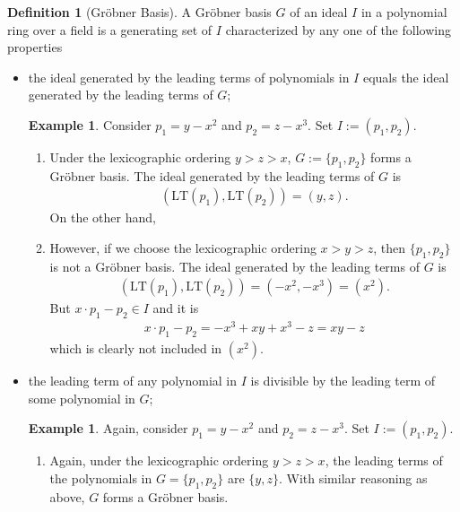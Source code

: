 \documentclass{book}
\theoremstyle{plain}
\theoremstyle{definition}
\newtheorem{exmp}[thm]{Example} %
\theoremstyle{custom_definition}
\newtheorem{defn}[thm]{Definition}
\begin{document}
\begin{defn}[Gröbner Basis]
A Gröbner basis \(G\) of an ideal \(I\) in a polynomial ring over a field is a generating set of \(I\) characterized by any one of the following properties
\begin{itemize}
    \item the ideal generated by the leading terms of polynomials in \(I\) equals the ideal generated by the leading terms of \(G\);
    \begin{exmp}
        Consider \(p_1 = y - x^2\) and \(p_2 = z - x^3\). Set \(I := (p_1, p_2)\).
        \begin{enumerate}
            \item Under the lexicographic ordering \(y > z > x\), \(G := \{p_1, p_2\}\) forms a Gröbner basis. The ideal generated by the leading terms of \(G\) is
            \begin{align}
                (\mathrm{LT}(p_1), \mathrm{LT}(p_2)) = (y, z) \text{.}
            \end{align}
            On the other hand, %
            \item However, if we choose the lexicographic ordering \(x > y > z\), then \(\{p_1, p_2\}\) is not a Gröbner basis. The ideal generated by the leading terms of \(G\) is
            \begin{align}
                (\mathrm{LT}(p_1), \mathrm{LT}(p_2)) = (-x^2, -x^3) = (x^2) \text{.}
            \end{align}
            But \(x \cdot p_1 - p_2 \in I\) and it is
            \begin{align}
                x \cdot p_1 - p_2 = -x^3 + xy + x^3 - z = xy - z
            \end{align}
            which is clearly not included in \((x^2)\).
        \end{enumerate}
    \end{exmp}
    \item the leading term of any polynomial in \(I\) is divisible by the leading term of some polynomial in \(G\);
    \begin{exmp}
        Again, consider \(p_1 = y - x^2\) and \(p_2 = z - x^3\). Set \(I := (p_1, p_2)\).
        \begin{enumerate}
            \item Again, under the lexicographic ordering \(y > z > x\), the leading terms of the polynomials in \(G = \{p_1, p_2\}\) are \(\{y, z\}\). With similar reasoning as above, \(G\) forms a Gröbner basis.

\end{enumerate}
\end{exmp}
\end{itemize}
\end{defn}
\end{document}

